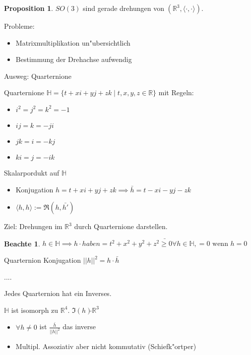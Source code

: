 \documentclass[oneside,fontsize=11pt,paper=a4,BCOR=0mm,DIV=12,automark,headsepline]{scrbook}
\theoremstyle{remark}
\theoremstyle{definition}
\newtheorem*{notte}{Beachte}
\newtheorem*{proposition}{Proposition}
\theoremstyle{definition}
\theoremstyle{remark}
\begin{document}
\begin{proposition}
  $SO(3)$ sind gerade drehungen von $(\mathbb{R}^3, \langle\cdot  , \cdot \rangle)$.
\end{proposition}

Probleme:
\begin{itemize}
\item Matrixmultiplikation un"ubersichtlich
\item Bestimmung der Drehachse aufwendig
\end{itemize}

Ausweg: Quarternione
\begin{definition}{Quarternione}{}
  $\mathbb{H} =\{t+xi+yj+zk \mid t,x,y,z \in \mathbb{R}\}$ mit Regeln:
  \begin{itemize}
  \item $i^2=j^2=k^2 = -1$
  \item $ij=k=-ji$
  \item $jk = i = -kj$
  \item $ki=j=-ik$
  \end{itemize}
\end{definition}
\begin{definition}{Skalarpordukt auf $\mathbb{H}$}{}
  \begin{itemize}
  \item Konjugation $h=t+xi+yj+zk \implies \bar{h}=t-xi-yj-zk$
  \item $\langle {h, h} \rangle := \Re (h, \bar{h'})$
  \end{itemize}
\end{definition}

Ziel: Drehungen im $\mathbb{R}^3$ durch Quarternione darstellen.

\begin{notte}
  $h\in \mathbb{H} \implies h\cdot \bar{haben = t^2+x^2+y^2+z^2 \geq 0 \forall h
    \in \mathbb{H}, = 0 \text{ wenn } h=0}$
\end{notte}

\begin{definition}{Quarternion Konjugation}{}
  $||h||^2 = h\cdot \bar{h}$
\end{definition}

\begin{relation}
  ....

  Jedes Quarternion hat ein Inverses.

  $\mathbb{H}$ ist isomorph zu $\mathbb{R}^4$. $\Im (h) \tilde{} \mathbb{R}^3$

  \begin{itemize}
  \item $\forall h \not= 0$  ist $\frac{\bar{h}}{||h||^2}$ das inverse
  \item Multipl. Assoziativ aber nicht kommutativ (Schiefk"ortper)
  \end{itemize}
\end{relation}
\end{document}
